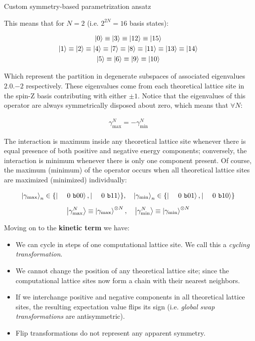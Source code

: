 \documentclass[9pt, handout, aspectratio=169]{beamer}	%
\begin{document}
\begin{frame}[allowframebreaks]{Custom symmetry-based parametrization ansatz}
	\medskip

	This means that for $N=2$ (i.e. $2^{2N}=16$ basis states):

	\begin{gather*}
	  \ket{0} \equiv \ket{3} \equiv \ket{12} \equiv \ket{15} \\
	  \ket{1} \equiv \ket{2} \equiv \ket{4} \equiv \ket{7} \equiv
	    \ket{8} \equiv \ket{11} \equiv \ket{13} \equiv \ket{14} \\
	  \ket{5} \equiv \ket{6} \equiv \ket{9} \equiv \ket{10}
	\end{gather*}

\break

	Which represent the partition in degenerate subspaces of associated eigenvalues $\qty{+2,0,-2}$ respectively. These eigenvalues come from each theoretical lattice site in the spin-Z basis contributing with either $\pm 1$. Notice that the eigenvalues of this operator are always symmetrically disposed about zero, which means that $\forall N$:

	\begin{gather*}
	  \gamma_{\text{max}}^{N} = - \gamma_{\text{min}}^{N}
	\end{gather*}

	The interaction is maximum inside any theoretical lattice site whenever there is equal presence of both positive and negative energy components; conversely, the interaction is minimum whenever there is only one component present. Of course, the maximum (minimum) of the operator occurs when all theoretical lattice sites are maximized (minimized) individually:

	\begin{gather*}
	  \ket{\gamma_{\text{max}}}_{n} \in \{\ket{\bin00}, \ket{\bin11}\} \qc
	  \ket{\gamma_{\text{min}}}_{n} \in \{\ket{\bin01}, \ket{\bin10}\} \\[5pt]
	  \ket{\gamma_{\text{max}}^{N}} \equiv
	    \ket{\gamma_{\text{max}}}^{\otimes N} \qc
	  \ket{\gamma_{\text{min}}^{N}} \equiv
	    \ket{\gamma_{\text{min}}}^{\otimes N}
	\end{gather*}

\break

	Moving on to the \textbf{kinetic term} we have:

	\medskip

	\begin{itemize}
	  \item We can cycle in steps of one computational lattice site. We call this a \emph{cycling transformation}.
	  \item We cannot change the position of any theoretical lattice site; since the computational lattice sites now form a chain with their nearest neighbors.
	  \item If we interchange positive and negative components in all theoretical lattice sites, the resulting expectation value flips its sign (i.e. \emph{global swap transformations} are antisymmetric).
	  \item Flip transformations do not represent any apparent symmetry.
	\end{itemize}


\end{frame}
\end{document}
